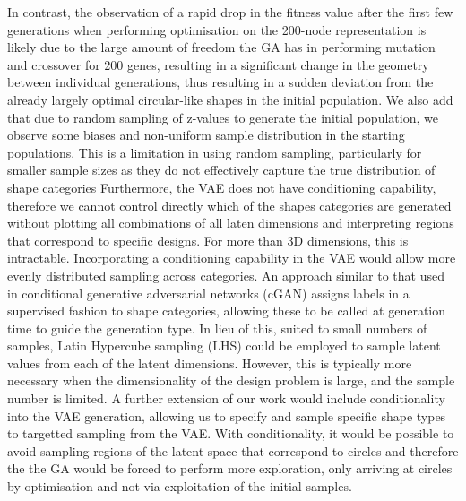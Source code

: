 \documentclass{article}
\begin{document}
In contrast, the observation of a rapid drop in the fitness value after the first few generations when performing optimisation on the 200-node representation is likely due to the large amount of freedom the GA has in performing mutation and crossover for 200 genes, resulting in a significant change in the geometry between individual generations, thus resulting in a sudden deviation from the already largely optimal circular-like shapes in the initial population. We also add that due to random sampling of z-values to generate the initial population, we observe some biases and non-uniform sample distribution in the starting populations. This is a limitation in using random sampling, particularly for smaller sample sizes as they do not effectively capture the true distribution of shape categories  Furthermore, the VAE does not have conditioning capability, therefore we cannot control directly which of the shapes categories are generated without plotting all combinations of all laten dimensions and interpreting regions that correspond to specific designs. For more than 3D dimensions, this is intractable. Incorporating a conditioning capability in the VAE would allow more evenly distributed sampling across categories. An approach similar to that used in conditional generative adversarial networks (cGAN) \citep{Mirza2014} assigns labels in a supervised fashion to shape categories, allowing these to be called at generation time to guide the generation type. In lieu of this, suited to small numbers of samples, Latin Hypercube sampling (LHS) \citep{Boschini2025} could be employed to sample latent values from each of the latent dimensions. However, this is typically more necessary when the dimensionality of the design problem is large, and the sample number is limited. A further extension of our work would include conditionality into the VAE generation, allowing us to specify and sample specific shape types to targetted sampling from the VAE. With conditionality, it would be possible to avoid sampling regions of the latent space that correspond to circles and therefore the the GA would be forced to perform more exploration, only arriving at circles by optimisation and not via exploitation of the initial samples. 
\end{document}
